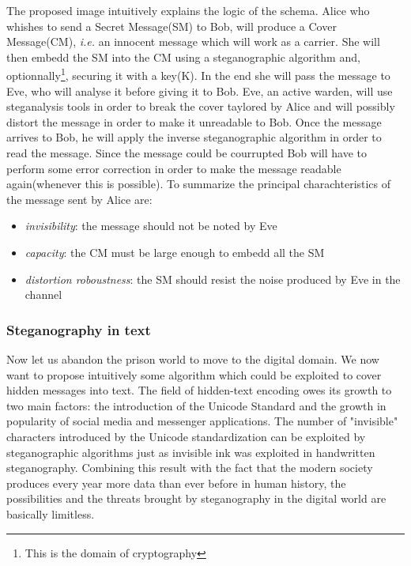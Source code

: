 \documentclass[../../main.tex]{subfiles}
\begin{document}
    The proposed image intuitively explains the logic of the schema.
    Alice who whishes to send a Secret Message(SM) to Bob, will produce a Cover
    Message(CM), \emph{i.e.} an innocent message which will work as a carrier.
    She will then embedd the SM into the CM using a steganographic algorithm
    and, optionnally\footnote{This is the domain of cryptography}, securing it
    with a key(K).
    In the end she will pass the message to Eve, who will analyse it before
    giving it to Bob.
    Eve, an active warden, will use steganalysis tools in order to break the
    cover taylored by Alice and will possibly distort the message in order to
    make it unreadable to Bob.
    Once the message arrives to Bob, he will apply the inverse steganographic
    algorithm in order to read the message.
    Since the message could be courrupted Bob will have to perform some error
    correction in order to make the message readable again(whenever this is
    possible).
    To summarize the principal charachteristics of the message sent by Alice
    are:
    \begin{itemize}
        \item \emph{invisibility}: the message should not be noted by Eve
        \item \emph{capacity}: the CM must be large enough to embedd all the SM
        \item \emph{distortion roboustness}: the SM should resist the noise
            produced by Eve in the channel
    \end{itemize}

    \subsubsection{Steganography in text}
    Now let us abandon the prison world to move to the digital domain.
    We now want to propose intuitively some algorithm which could be exploited
    to cover hidden messages into text.
    The field of hidden-text encoding owes its growth to two main factors: the
    introduction of the Unicode Standard and the growth in popularity of social
    media and messenger applications.
    The number of "invisible" characters introduced by the Unicode
    standardization can be exploited by steganographic algorithms just as
    invisible ink was exploited in handwritten steganography.
    Combining this result with the fact that the modern society produces every
    year more data than ever before in human history, the possibilities and the
    threats brought by steganography in the digital world are basically
    limitless.
\end{document}
